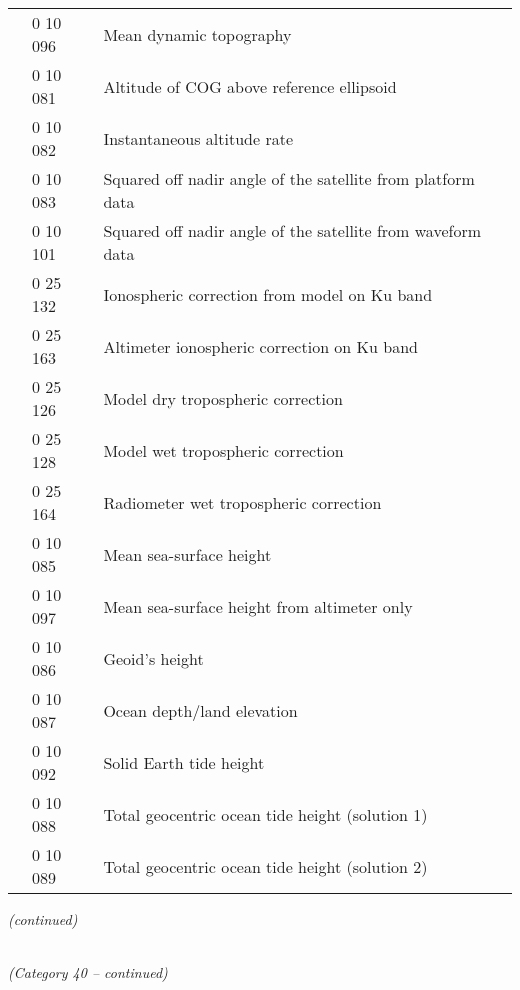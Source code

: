 \begin{longtable}[]{@{}llll@{}}
& 0 10 096 & Mean dynamic topography &\tabularnewline
& 0 10 081 & Altitude of COG above reference ellipsoid &\tabularnewline
& 0 10 082 & Instantaneous altitude rate &\tabularnewline
& 0 10 083 & Squared off nadir angle of the satellite from platform data &\tabularnewline
& 0 10 101 & Squared off nadir angle of the satellite from waveform data &\tabularnewline
& 0 25 132 & Ionospheric correction from model on Ku band &\tabularnewline
& 0 25 163 & Altimeter ionospheric correction on Ku band &\tabularnewline
& 0 25 126 & Model dry tropospheric correction &\tabularnewline
& 0 25 128 & Model wet tropospheric correction &\tabularnewline
& 0 25 164 & Radiometer wet tropospheric correction &\tabularnewline
& 0 10 085 & Mean sea-surface height &\tabularnewline
& 0 10 097 & Mean sea-surface height from altimeter only &\tabularnewline
& 0 10 086 & Geoid's height &\tabularnewline
& 0 10 087 & Ocean depth/land elevation &\tabularnewline
& 0 10 092 & Solid Earth tide height &\tabularnewline
& 0 10 088 & Total geocentric ocean tide height (solution 1) &\tabularnewline
& 0 10 089 & Total geocentric ocean tide height (solution 2) &\tabularnewline
\bottomrule
\end{longtable}

\emph{(continued)}

\emph{\\
(Category 40 -- continued)}

